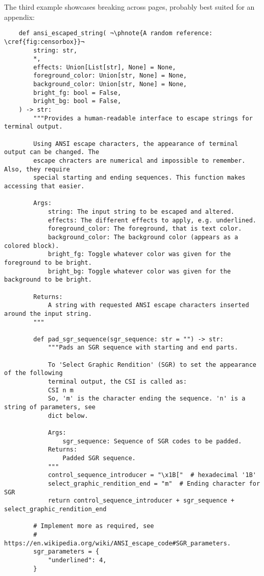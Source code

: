 The third example showcases breaking across pages, probably best suited for an appendix:
\begin{verbatim}
    def ansi_escaped_string( ¬\phnote{A random reference: \cref{fig:censorbox}}¬
        string: str,
        *,
        effects: Union[List[str], None] = None,
        foreground_color: Union[str, None] = None,
        background_color: Union[str, None] = None,
        bright_fg: bool = False,
        bright_bg: bool = False,
    ) -> str:
        """Provides a human-readable interface to escape strings for terminal output.

        Using ANSI escape characters, the appearance of terminal output can be changed. The
        escape chracters are numerical and impossible to remember. Also, they require
        special starting and ending sequences. This function makes accessing that easier.

        Args:
            string: The input string to be escaped and altered.
            effects: The different effects to apply, e.g. underlined.
            foreground_color: The foreground, that is text color.
            background_color: The background color (appears as a colored block).
            bright_fg: Toggle whatever color was given for the foreground to be bright.
            bright_bg: Toggle whatever color was given for the background to be bright.

        Returns:
            A string with requested ANSI escape characters inserted around the input string.
        """

        def pad_sgr_sequence(sgr_sequence: str = "") -> str:
            """Pads an SGR sequence with starting and end parts.

            To 'Select Graphic Rendition' (SGR) to set the appearance of the following
            terminal output, the CSI is called as:
            CSI n m
            So, 'm' is the character ending the sequence. 'n' is a string of parameters, see
            dict below.

            Args:
                sgr_sequence: Sequence of SGR codes to be padded.
            Returns:
                Padded SGR sequence.
            """
            control_sequence_introducer = "\x1B["  # hexadecimal '1B'
            select_graphic_rendition_end = "m"  # Ending character for SGR
            return control_sequence_introducer + sgr_sequence + select_graphic_rendition_end

        # Implement more as required, see
        # https://en.wikipedia.org/wiki/ANSI_escape_code#SGR_parameters.
        sgr_parameters = {
            "underlined": 4,
        }


\end{verbatim}
